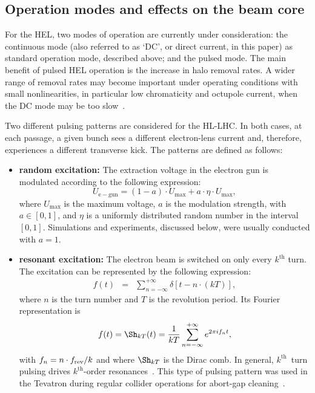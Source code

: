 \documentclass[%
 reprint,
 amsmath,amssymb,
 aps,
prstab,
longbibliography,
]{revtex4-1}
\begin{document}
\subsection{Operation modes and effects on the beam core}
\label{sec:hel:core}

For the HEL, two modes of operation are currently under consideration:
the continuous mode (also referred to as `DC', or direct current, in
this paper) as standard operation mode, described above; and the
pulsed mode. The main benefit of pulsed HEL operation is the increase
in halo removal rates. A wider range of removal rates may become
important under operating conditions with small nonlinearities, in
particular low chromaticity and octupole current, when the DC mode may
be too slow~\cite{hel_halo_hllhc_fitterer, hl_halo_ipac2017}.

Two different pulsing patterns are considered for the HL-LHC. In both
cases, at each passage, a given bunch sees a different electron-lens
current and, therefore, experiences a different transverse kick. The
patterns are defined as follows:

\begin{itemize}

\item \textbf{random excitation:} The extraction voltage in the
  electron gun is modulated according to the
  following expression:
%
  \begin{equation}
    U_{\mathrm{e-gun}} = (1-a) \cdot U_{\mathrm{max}} +
    a \cdot \eta \cdot U_{\mathrm{max}},
  \end{equation}
%
  where $U_{\mathrm{max}}$ is the maximum voltage, $a$ is the
  modulation strength, with $a \in [0,1]$, and $\eta$ is a uniformly
  distributed random number in the interval~$[0,1]$. Simulations and
  experiments, discussed below, were usually conducted with $a = 1$.

\item \textbf{resonant excitation:} The electron beam is switched on
  only every $k^{\mathrm{th}}$ turn. The excitation can be represented
  by the following expression:
  \begin{eqnarray}
    \label{intro:eqn:1}
    f(t) & = & \sum_{n=-\infty}^{+\infty}\delta\left[t-n\cdot(kT)\right],
  \end{eqnarray}
  where $n$ is the turn number and $T$ is the revolution period. Its
  Fourier representation is
  \begin{equation}
    \label{intro:eqn:2}
    f(t) = \Sh_{kT}(t) = \frac{1}{kT}\sum_{n=-\infty}^{+\infty}e^{2\pi i f_nt},
  \end{equation}
  with $f_n = n \cdot f_{\rm rev} / k$ and
  where $\Sh_{kT}$ is the Dirac comb. In general,
  $k^{\mathrm{th}}$~turn pulsing drives $k^{\mathrm{th}}$-order
  resonances~\cite{md_sim_hel_res_ex_fitterer}. This type of pulsing
  pattern was used in the Tevatron during regular collider operations
  for abort-gap cleaning~\cite{hel_tevatron_abortgap_zhang}.
\end{itemize}
\end{document}
